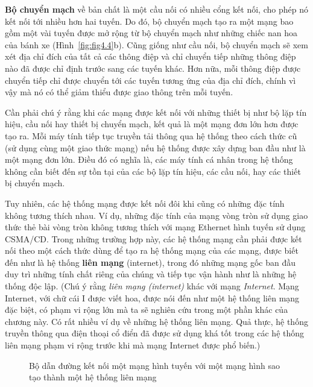 \textbf{Bộ chuyển mạch} về bản chất là một cầu nối có nhiều cổng kết nối, cho phép nó kết
nối tới nhiều hơn hai tuyến. Do đó, bộ chuyển mạch tạo ra một mạng bao gồm một vài tuyến
được mở rộng từ bộ chuyển mạch như những chiếc nan hoa của bánh xe
(Hình~\ref{fig:fig4.4}b). Cũng giống như cầu nối, bộ chuyển mạch sẽ xem xét địa chỉ đích
của tất cả các thông điệp và chỉ chuyển tiếp những thông điệp nào đã được chỉ định trước
sang các tuyến khác. Hơn nữa, mỗi thông điệp được chuyển tiếp chỉ được chuyển tới các
tuyến tương ứng của địa chỉ đích, chính vì vậy mà nó có thể giảm thiểu được giao thông
trên mỗi tuyến.

Cần phải chú ý rằng khi các mạng được kết nối với những thiết bị như bộ lặp tín hiệu, cầu
nối hay thiết bị chuyển mạch, kết quả là một mạng đơn lớn hơn được tạo ra. Mỗi máy tính
tiếp tục truyền tải thông qua hệ thống theo cách thức cũ (sử dụng cùng một giao thức mạng)
nếu hệ thống được xây dựng ban đầu như là một mạng đơn lớn. Điều đó có nghĩa là, các máy
tính cá nhân trong hệ thống không cần biết đến sự tồn tại của các bộ lặp tín hiệu, các cầu
nối, hay các thiết bị chuyển mạch.

Tuy nhiên, các hệ thống mạng được kết nối đôi khi cũng có những đặc tính không tương thích
nhau. Ví dụ, những đặc tính của mạng vòng tròn sử dụng giao thức thẻ bài vòng tròn
không tương thích với mạng Ethernet hình tuyến sử dụng CSMA/CD. Trong những trường hợp
này, các hệ thống mạng cần phải được kết nối theo một cách thức dùng để tạo ra hệ thống
mạng của các mạng, được biết đến như là hệ thống \textbf{liên mạng} (internet), trong đó
những mạng gốc ban đầu duy trì những tính chất riêng của chúng và tiếp tục vận hành như là
những hệ thống độc lập. (Chú ý rằng \textit{liên mạng (internet)} khác với mạng
\textit{Internet}. Mạng Internet, với chữ cái I được viết hoa, được nói đến như một hệ
thống liên mạng đặc biệt, có phạm vi rộng lớn mà ta sẽ nghiên cứu trong một phần khác của
chương này. Có rất nhiều ví dụ về những hệ thống liên mạng. Quả thực, hệ thống truyền
thông qua điện thoại cổ điển đã được sử dụng khá tốt trong các hệ thống liên mạng phạm vi
rộng trước khi mà mạng Internet được phổ biến.)


\begin{figure}[tb] 
  \centering {}
  \caption{Bộ dẫn đường kết nối một mạng hình tuyến với một mạng hình sao tạo thành một hệ
    thống liên mạng}
  \label{fig:fig4.5}
\end{figure}

